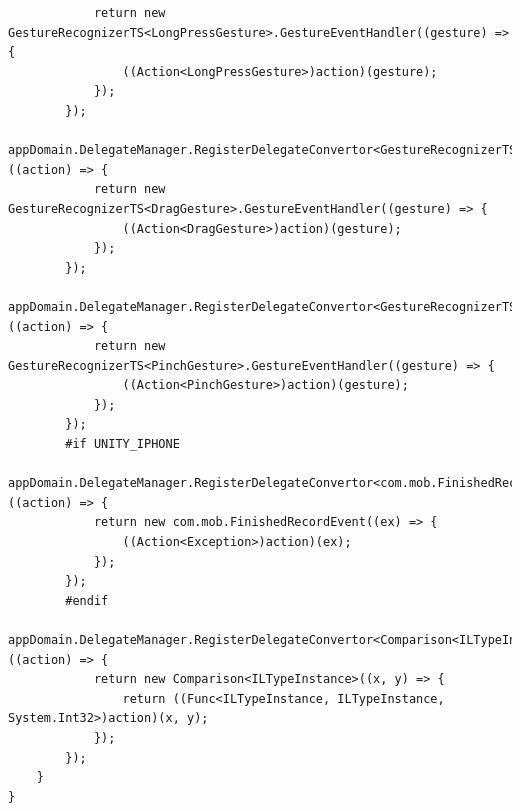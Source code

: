 \documentclass[9pt, b5paper]{article}
\begin{document}
\begin{verbatim}
            return new GestureRecognizerTS<LongPressGesture>.GestureEventHandler((gesture) => {
                ((Action<LongPressGesture>)action)(gesture);
            });
        });
        appDomain.DelegateManager.RegisterDelegateConvertor<GestureRecognizerTS<DragGesture>.GestureEventHandler>((action) => {
            return new GestureRecognizerTS<DragGesture>.GestureEventHandler((gesture) => {
                ((Action<DragGesture>)action)(gesture);
            });
        });
        appDomain.DelegateManager.RegisterDelegateConvertor<GestureRecognizerTS<PinchGesture>.GestureEventHandler>((action) => {
            return new GestureRecognizerTS<PinchGesture>.GestureEventHandler((gesture) => {
                ((Action<PinchGesture>)action)(gesture);
            });
        });
        #if UNITY_IPHONE
                appDomain.DelegateManager.RegisterDelegateConvertor<com.mob.FinishedRecordEvent>((action) => {
            return new com.mob.FinishedRecordEvent((ex) => {
                ((Action<Exception>)action)(ex);
            });
        });
        #endif
        appDomain.DelegateManager.RegisterDelegateConvertor<Comparison<ILTypeInstance>>((action) => {
            return new Comparison<ILTypeInstance>((x, y) => {
                return ((Func<ILTypeInstance, ILTypeInstance, System.Int32>)action)(x, y);
            });
        });
    }
}
\end{verbatim}
\end{document}
